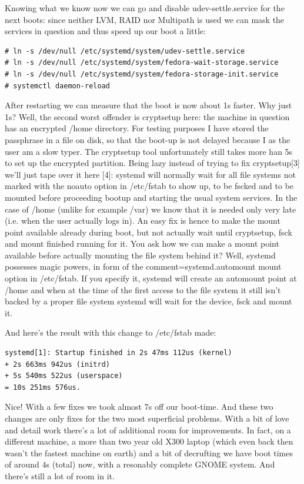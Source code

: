 \documentclass[titlepage]{article}
\begin{document}
Knowing what we know now we can go and disable udev-settle.service for the next boots: since neither LVM, RAID nor Multipath is used we can mask the services in question and thus speed up our boot a little:
\begin{lstlisting}
# ln -s /dev/null /etc/systemd/system/udev-settle.service
# ln -s /dev/null /etc/systemd/system/fedora-wait-storage.service
# ln -s /dev/null /etc/systemd/system/fedora-storage-init.service
# systemctl daemon-reload
\end{lstlisting}
After restarting we can measure that the boot is now about 1s faster. Why just 1s? Well, the second worst offender is cryptsetup here: the machine in question has an encrypted /home directory. For testing purposes I have stored the passphrase in a file on disk, so that the boot-up is not delayed because I as the user am a slow typer. The cryptsetup tool unfortunately still takes more han 5s to set up the encrypted partition. Being lazy instead of trying to fix cryptsetup[3] we'll just tape over it here [4]: systemd will normally wait for all file systems not marked with the noauto option in /etc/fstab to show up, to be fscked and to be mounted before proceeding bootup and starting the usual system services. In the case of /home (unlike for example /var) we know that it is needed only very late (i.e. when the user actually logs in). An easy fix is hence to make the mount point available already during boot, but not actually wait until cryptsetup, fsck and mount finished running for it. You ask how we can make a mount point available before actually mounting the file system behind it? Well, systemd possesses magic powers, in form of the comment=systemd.automount mount option in /etc/fstab. If you specify it, systemd will create an automount point at /home and when at the time of the first access to the file system it still isn't backed by a proper file system systemd will wait for the device, fsck and mount it.

And here's the result with this change to /etc/fstab made:
\begin{lstlisting}
systemd[1]: Startup finished in 2s 47ms 112us (kernel) 
+ 2s 663ms 942us (initrd) 
+ 5s 540ms 522us (userspace) 
= 10s 251ms 576us.
\end{lstlisting}
Nice! With a few fixes we took almost 7s off our boot-time. And these two changes are only fixes for the two most superficial problems. With a bit of love and detail work there's a lot of additional room for improvements. In fact, on a different machine, a more than two year old X300 laptop (which even back then wasn't the fastest machine on earth) and a bit of decrufting we have boot times of around 4s (total) now, with a resonably complete GNOME system. And there's still a lot of room in it.
\end{document}
